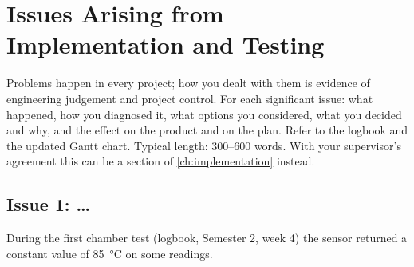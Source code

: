 \chapter{Issues Arising from Implementation and Testing}
\label{ch:issues}

\begin{guidance}
Problems happen in every project; how you dealt with them is evidence of
engineering judgement and project control. For each significant issue:
what happened, how you diagnosed it, what options you considered, what you
decided and why, and the effect on the product and on the plan. Refer to the
logbook and the updated Gantt chart. Typical length: 300--600 words. With
your supervisor's agreement this can be a section of
\cref{ch:implementation} instead.
\end{guidance}

\section{Issue 1: \ldots}
\label{sec:issue1}

During the first chamber test (logbook, Semester 2, week 4) the sensor returned
a constant value of \SI{85}{\celsius} on some readings. 
